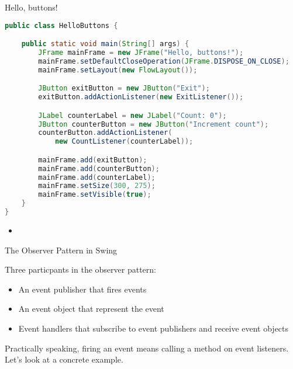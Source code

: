 \documentclass{beamer}
\begin{document}
\begin{frame}[fragile]{Hello, buttons!}


\begin{lstlisting}[language=Java]
public class HelloButtons {

    public static void main(String[] args) {
        JFrame mainFrame = new JFrame("Hello, buttons!");
        mainFrame.setDefaultCloseOperation(JFrame.DISPOSE_ON_CLOSE);
        mainFrame.setLayout(new FlowLayout());

        JButton exitButton = new JButton("Exit");
        exitButton.addActionListener(new ExitListener());

        JLabel counterLabel = new JLabel("Count: 0");
        JButton counterButton = new JButton("Increment count");
        counterButton.addActionListener(
            new CountListener(counterLabel));

        mainFrame.add(exitButton);
        mainFrame.add(counterButton);
        mainFrame.add(counterLabel);
        mainFrame.setSize(300, 275);
        mainFrame.setVisible(true);
    }
}
\end{lstlisting}

\begin{itemize}
\item
\end{itemize}


\end{frame}

\begin{frame}[fragile]{The Observer Pattern in Swing}


Three particpants in the observer pattern:
\begin{itemize}
\item An event publisher that fires events
\item An event object that represent the event
\item Event handlers that subscribe to event publishers and receive event objects
\end{itemize}

Practically speaking, firing an event means calling a method on event listeners.  Let's look at a concrete example.




\end{frame}
\end{document}
